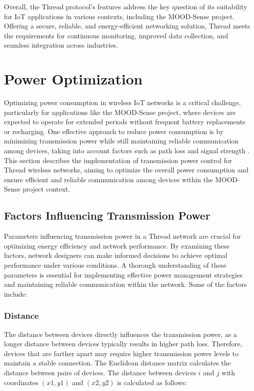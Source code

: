 Overall, the Thread protocol's features address the key question of its suitability for IoT applications in various contexts, including the MOOD-Sense project. Offering a secure, reliable, and energy-efficient networking solution, Thread meets the requirements for continuous monitoring, improved data collection, and seamless integration across industries.


\section{Power Optimization}\label{sec:power_optimization}

Optimizing power consumption in wireless IoT networks is a critical challenge, particularly for applications like the MOOD-Sense project, where devices are expected to operate for extended periods without frequent battery replacements or recharging. One effective approach to reduce power consumption is by minimizing transmission power while still maintaining reliable communication among devices, taking into account factors such as path loss and signal strength \cite{sheth2002implementation}. This section describes the implementation of transmission power control for Thread wireless networks, aiming to optimize the overall power consumption and ensure efficient and reliable communication among devices within the MOOD-Sense project context.

\subsection{Factors Influencing Transmission Power}

Parameters influencing transmission power in a Thread network are crucial for optimizing energy efficiency and network performance. By examining these factors, network designers can make informed decisions to achieve optimal performance under various conditions. A thorough understanding of these parameters is essential for implementing effective power management strategies and maintaining reliable communication within the network. Some of the factors include:

\subsubsection{Distance}

The distance between devices directly influences the transmission power, as a longer distance between devices typically results in higher path loss. Therefore, devices that are farther apart may require higher transmission power levels to maintain a stable connection. The Euclidean distance matrix calculates the distance between pairs of devices. The distance between devices $i$ and $j$ with coordinates $\left(x1,y1\right)$ and $\left(x2,y2\right)$ is calculated as follows:

